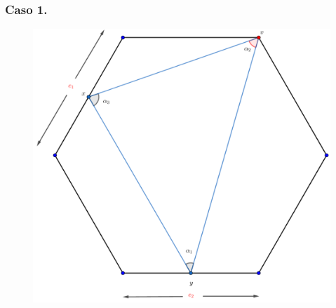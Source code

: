 {

\begin{frame}
  \frametitle{Caso 1.}
  \begin{figure}
    \centering
    \includegraphics[width=.50 \paperwidth]{./images/Bosquejo1.png}
  \end{figure}
\end{frame}

}
